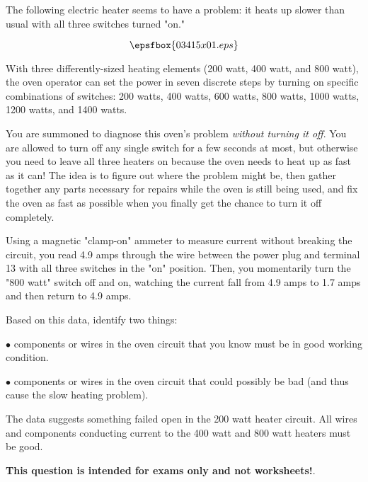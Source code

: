 

The following electric heater seems to have a problem: it heats up slower than usual with all three switches turned "on."

$$\epsfbox{03415x01.eps}$$

With three differently-sized heating elements (200 watt, 400 watt, and 800 watt), the oven operator can set the power in seven discrete steps by turning on specific combinations of switches: 200 watts, 400 watts, 600 watts, 800 watts, 1000 watts, 1200 watts, and 1400 watts.

You are summoned to diagnose this oven's problem {\it without turning it off}.  You are allowed to turn off any single switch for a few seconds at most, but otherwise you need to leave all three heaters on because the oven needs to heat up as fast as it can!  The idea is to figure out where the problem might be, then gather together any parts necessary for repairs while the oven is still being used, and fix the oven as fast as possible when you finally get the chance to turn it off completely.

Using a magnetic "clamp-on" ammeter to measure current without breaking the circuit, you read 4.9 amps through the wire between the power plug and terminal 13 with all three switches in the "on" position.  Then, you momentarily turn the "800 watt" switch off and on, watching the current fall from 4.9 amps to 1.7 amps and then return to 4.9 amps.

Based on this data, identify two things:

\vskip 10pt

\medskip
\item{$\bullet$}  components or wires in the oven circuit that you know must be in good working condition.
\vskip 40pt
\item{$\bullet$}  components or wires in the oven circuit that could possibly be bad (and thus cause the slow heating problem).
\medskip







The data suggests something failed open in the 200 watt heater circuit.  All wires and components conducting current to the 400 watt and 800 watt heaters must be good.







{\bf This question is intended for exams only and not worksheets!}.



